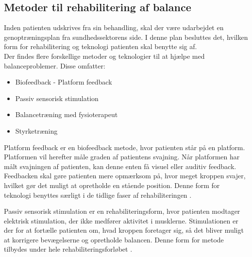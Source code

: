 \subsection{Metoder til rehabilitering af balance}

Inden patienten udskrives fra sin behandling, skal der være udarbejdet en genoptræningsplan fra sundhedssektorens side. I denne plan besluttes det, hvilken form for rehabilitering og teknologi patienten skal benytte sig af. \cite{Sundhedsstyrelsen2011a} \\
Der findes flere forskellige metoder og teknologier til at hjælpe med balanceproblemer. Disse omfatter: \cite{Sundhedsstyrelsen2011a}  

\begin{itemize}
\item Biofeedback - Platform feedback
\item Passiv sensorisk stimulation
\item Balancetræning med fysioterapeut
\item Styrketræning
\end{itemize}

Platform feedback er en biofeedback metode, hvor patienten står på en platform. Platformen vil herefter måle graden af patientens svajning. Når platformen har målt svajningen af patienten, kan denne enten få visuel eller auditiv feedback. Feedbacken skal gøre patienten mere opmærksom på, hvor meget kroppen svajer, hvilket gør det muligt at opretholde en stående position. \cite{Barclay-Goddard2004} Denne form for teknologi benyttes særligt i de tidlige faser af rehabiliteringen \cite{Sundhedsstyrelsen2011a}. 

Passiv sensorisk stimulation er en rehabiliteringsform, hvor patienten modtager elektrisk stimulation, der ikke medfører aktivitet i musklerne. Stimulationen er der for at fortælle patienten om, hvad kroppen foretager sig, så det bliver muligt at korrigere bevægelserne og opretholde balancen. \cite{Sundhedsstyrelsen2010} Denne form for metode tilbydes under hele rehabiliteringsforløbet \cite{Sundhedsstyrelsen2011a}.

